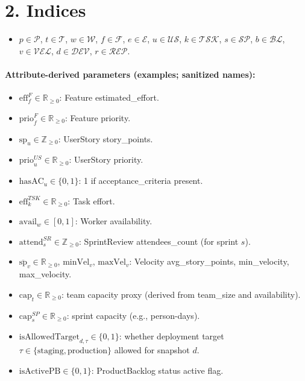 \documentclass[11pt,a4paper]{article}
\begin{document}
\section{2. Indices}
\begin{itemize}[leftmargin=1.2em]
  \item $p \in \mathcal{P}$, $t \in \mathcal{T}$, $w \in \mathcal{W}$, $f \in \mathcal{F}$, $e \in \mathcal{E}$, $u \in \mathcal{US}$, $k \in \mathcal{TSK}$, $s \in \mathcal{SP}$, $b \in \mathcal{BL}$, $v \in \mathcal{VEL}$, $d \in \mathcal{DEV}$, $r \in \mathcal{REP}$.
\end{itemize}

\paragraph{Attribute-derived parameters (examples; sanitized names):}
\begin{itemize}[leftmargin=1.2em]
  \item $\mathrm{eff}^{F}_f \in \mathbb{R}_{\ge 0}$: Feature estimated\_effort.
  \item $\mathrm{prio}^{F}_f \in \mathbb{R}_{\ge 0}$: Feature priority.
  \item $\mathrm{sp}_u \in \mathbb{Z}_{\ge 0}$: UserStory story\_points.
  \item $\mathrm{prio}^{US}_u \in \mathbb{R}_{\ge 0}$: UserStory priority.
  \item $\mathrm{hasAC}_u \in \{0,1\}$: 1 if acceptance\_criteria present.
  \item $\mathrm{eff}^{TSK}_k \in \mathbb{R}_{\ge 0}$: Task effort.
  \item $\mathrm{avail}_w \in [0,1]$: Worker availability.
  \item $\mathrm{attend}^{SR}_s \in \mathbb{Z}_{\ge 0}$: SprintReview attendees\_count (for sprint $s$).
  \item $\overline{\mathrm{sp}}_v \in \mathbb{R}_{\ge 0}$, $\mathrm{minVel}_v$, $\mathrm{maxVel}_v$: Velocity avg\_story\_points, min\_velocity, max\_velocity.
  \item $\mathrm{cap}_t \in \mathbb{R}_{\ge 0}$: team capacity proxy (derived from team\_size and availability).
  \item $\mathrm{cap}^{SP}_s \in \mathbb{R}_{\ge 0}$: sprint capacity (e.g., person-days).
  \item $\mathrm{isAllowedTarget}_{d,\tau} \in \{0,1\}$: whether deployment target $\tau \in \{\text{staging},\text{production}\}$ allowed for snapshot $d$.
  \item $\mathrm{isActivePB} \in \{0,1\}$: ProductBacklog status active flag.
\end{itemize}
\end{document}
